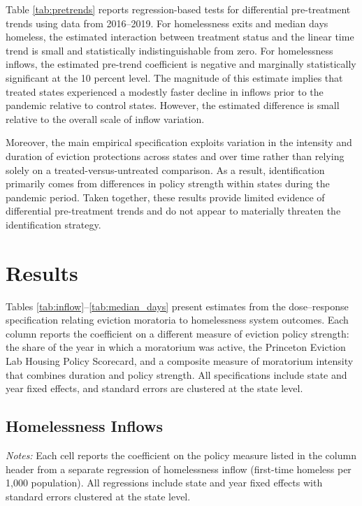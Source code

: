 \documentclass[12pt]{article}
\begin{document}
Table \ref{tab:pretrends} reports regression-based tests for differential pre-treatment trends using data from 2016–2019. For homelessness exits and median days homeless, the estimated interaction between treatment status and the linear time trend is small and statistically indistinguishable from zero. For homelessness inflows, the estimated pre-trend coefficient is negative and marginally statistically significant at the 10 percent level. The magnitude of this estimate implies that treated states experienced a modestly faster decline in inflows prior to the pandemic relative to control states. However, the estimated difference is small relative to the overall scale of inflow variation.

Moreover, the main empirical specification exploits variation in the intensity and duration of eviction protections across states and over time rather than relying solely on a treated-versus-untreated comparison. As a result, identification primarily comes from differences in policy strength within states during the pandemic period. Taken together, these results provide limited evidence of differential pre-treatment trends and do not appear to materially threaten the identification strategy.

\section{Results}

Tables \ref{tab:inflow}--\ref{tab:median_days} present estimates from the dose–response specification relating eviction moratoria to homelessness system outcomes. Each column reports the coefficient on a different measure of eviction policy strength: the share of the year in which a moratorium was active, the Princeton Eviction Lab Housing Policy Scorecard, and a composite measure of moratorium intensity that combines duration and policy strength. All specifications include state and year fixed effects, and standard errors are clustered at the state level.

\subsection{Homelessness Inflows}

\begin{table}
\centering
\begin{threeparttable}
\caption{Eviction Moratoria and Homelessness Inflows}
\label{tab:inflow}

\begin{tablenotes}[flushleft]
\footnotesize
\item \textit{Notes:} Each cell reports the coefficient on the policy measure listed in the column header from a separate regression of homelessness inflow (first-time homeless per 1,000 population). All regressions include state and year fixed effects with standard errors clustered at the state level.
\end{tablenotes}
\end{threeparttable}
\end{table}
\end{document}
